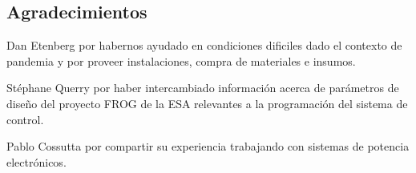 \documentclass[11pt, titlepage]{article}
\begin{document}
\newpage



\null\newpage
\clearpage



\null\newpage
\clearpage



\null\newpage
\clearpage



\null\newpage
\clearpage




\null\newpage
\clearpage



\null\newpage
\clearpage



\null\newpage
\clearpage




\null\newpage
\clearpage



\null\newpage
\clearpage




\subsection*{Agradecimientos}
Dan Etenberg por habernos ayudado en condiciones dificiles dado el contexto de pandemia y por proveer instalaciones, compra de materiales e insumos. 

\medskip

Stéphane Querry por haber intercambiado información acerca de parámetros de diseño del proyecto FROG de la ESA relevantes a la programación del sistema de control.

\medskip

Pablo Cossutta por compartir su experiencia trabajando con sistemas de potencia electrónicos. 



% 
%

\null\newpage
\clearpage


\end{document}
